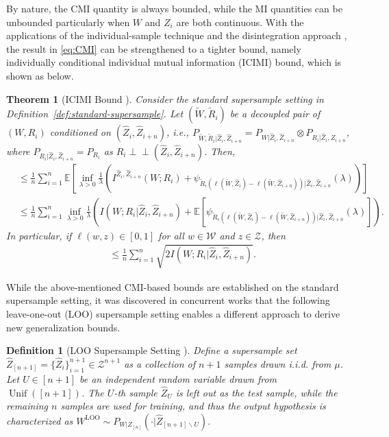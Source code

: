 \documentclass[onecolumn,romanappendices,10pt]{IEEEtran}
\newtheorem{theorem}{Theorem}
\newtheorem{definition}{Definition}
\newcommand{\Wcal}{{\mathcal W}}
\newcommand{\Zcal}{{\mathcal Z}}
\newcommand{\EE}{{\mathbb{E}}}
\DeclareMathOperator{\gen}{\overline{gen}}
\DeclareMathOperator{\Uniform}{Unif}
\newcommand\indep{ \perp \!\!\! \perp}
\begin{document}
	By nature, the CMI quantity is always bounded, while the MI quantities can be unbounded particularly when $W$ and $Z_i$ are both continuous. With the applications of the individual-sample technique \cite{bu2020tightening} and the disintegration approach \cite{negrea2019information}, the result in \eqref{eq:CMI} can be strengthened to a tighter bound, namely individually conditional individual mutual information (ICIMI) bound, which is shown as below.
	\begin{theorem}[ICIMI Bound \cite{zhou2022individually}] \label{thm:ICIMI}
		Consider the standard supersample setting in Definition~\ref{def:standard-supersample}. Let $(\tilde{W}, \tilde{R}_i)$ be a decoupled pair of $(W, R_i)$ conditioned on $(\hat{Z}_{i}, \hat{Z}_{i+n})$, i.e., $P_{\tilde{W},\tilde{R}_i| \hat{Z}_{i}, \hat{Z}_{i+n}} = P_{W | \hat{Z}_{i}, \hat{Z}_{i+n}} \otimes P_{R_i | \hat{Z}_{i}, \hat{Z}_{i+n}}$, where $P_{R_i | \hat{Z}_{i}, \hat{Z}_{i+n}} = P_{R_i}$ as $R_i \indep (\hat{Z}_{i}, \hat{Z}_{i+n})$. Then,
		\begin{align}
			\gen &\leq \frac{1}{n} \sum_{i=1}^n \EE \left[ \inf_{\lambda > 0} \frac{1}{\lambda} \left( I^{\hat{Z}_i, \hat{Z}_{i+n}}\left( W; R_i \right) + \psi_{\tilde{R}_i(\ell(\tilde{W}, \hat{Z}_i) - \ell(\tilde{W}, \hat{Z}_{i+n})) | \hat{Z}_{i}, \hat{Z}_{i+n}}(\lambda) \right) \right] \label{eq:gen-dis-ICIMI}\\
			&\leq \frac{1}{n} \sum_{i=1}^n \inf_{\lambda > 0} \frac{1}{\lambda} \left( I\left( W; R_i | \hat{Z}_i, \hat{Z}_{i+n} \right) + \EE \left[ \psi_{\tilde{R}_i(\ell(\tilde{W}, \hat{Z}_i) - \ell(\tilde{W}, \hat{Z}_{i+n})) | \hat{Z}_{i}, \hat{Z}_{i+n}}(\lambda) \right] \right). \label{eq:gen-ICIMI}
		\end{align}
		In particular, if $\ell(w, z) \in [0, 1]$ for all $w \in \Wcal$ and $z \in \Zcal$, then
		\begin{align}
			\gen &\leq \frac{1}{n} \sum_{i = 1}^n \sqrt{2 I\left( W; R_i | \hat{Z}_i, \hat{Z}_{i+n} \right)}.
			\label{eq:ICIMI}
		\end{align}
	\end{theorem}
	While the above-mentioned CMI-based bounds are established on the standard supersample setting, it was discovered in concurrent works \cite{haghifam2022understanding,rammal2022leave} that the following leave-one-out (LOO) supersample setting enables a different approach to derive new generalization bounds.
	\begin{definition}[LOO Supersample Setting \cite{haghifam2022understanding,rammal2022leave}] \label{def:loo-supersample}
		Define a supersample set $\hat{Z}_{[n+1]} = \{\hat{Z}_i\}_{i=1}^{n+1} \in \Zcal^{n+1}$ as a collection of $n+1$ samples drawn i.i.d. from $\mu$. Let $U \in [n+1]$ be an independent random variable drawn from $\Uniform([n+1])$. The $U$-th sample $\hat{Z}_U$ is left out as the test sample, while the remaining $n$ samples are used for training, and thus the output hypothesis is characterized as $W^{\textrm{LOO}} \sim P_{W|Z_{[n]}}(\cdot | \hat{Z}_{[n+1] \backslash U})$.
	\end{definition}
\end{document}
